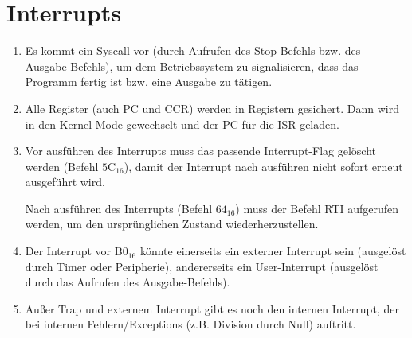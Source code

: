 \documentclass[DIN, pagenumber=false, fontsize=11pt, parskip=half]{scrartcl}
\begin{document}
    \section{Interrupts}
    \begin{enumerate}[label=(\alph*)]
        \item Es kommt ein Syscall vor (durch Aufrufen des Stop Befehls bzw. des Ausgabe-Befehls), um dem Betriebssystem zu signalisieren, dass das Programm fertig ist bzw. eine Ausgabe zu tätigen.
        \item Alle Register (auch PC und CCR) werden in Registern gesichert. Dann wird in den Kernel-Mode gewechselt und der PC für die ISR geladen.
        \item Vor ausführen des Interrupts muss das passende Interrupt-Flag gelöscht werden (Befehl ${5\text{C}}_{16}$), damit der Interrupt nach ausführen nicht sofort erneut ausgeführt wird. 
            
            Nach ausführen des Interrupts (Befehl ${64}_{16}$) muss der Befehl RTI aufgerufen werden, um den ursprünglichen Zustand wiederherzustellen.
        \item Der Interrupt vor ${\text{B}0}_{16}$ könnte einerseits ein externer Interrupt sein (ausgelöst durch Timer oder Peripherie), andererseits ein User-Interrupt (ausgelöst durch das Aufrufen des Ausgabe-Befehls).
        \item Außer Trap und externem Interrupt gibt es noch den internen Interrupt, der bei internen Fehlern/Exceptions (z.B. Division durch Null) auftritt.
    \end{enumerate}
\end{document}
